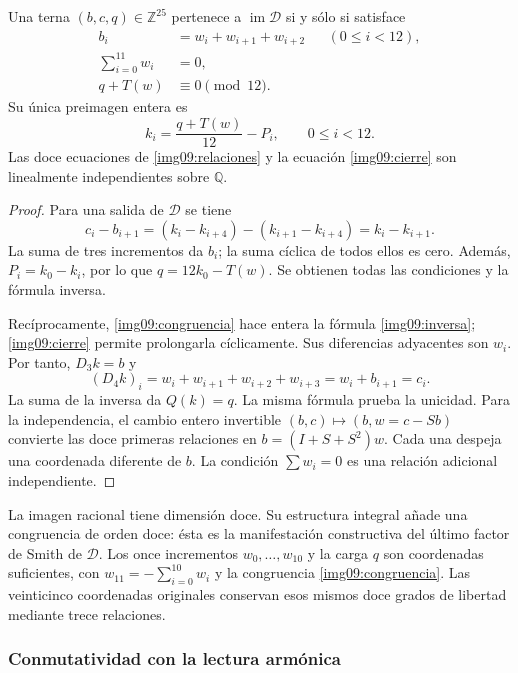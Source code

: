 \begin{theorem}
\label{img09:imagen}
Una terna $(b,c,q)\in\mathbb Z^{25}$ pertenece a
$\operatorname{im}\mathcal D$ si y sólo si satisface
\begin{align}
 b_i&=w_i+w_{i+1}+w_{i+2}&& (0\leq i<12),
 \label{img09:relaciones}\\
 \sum_{i=0}^{11}w_i&=0,
 \label{img09:cierre}\\
 q+T(w)&\equiv0\pmod {12}.
 \label{img09:congruencia}
\end{align}
Su única preimagen entera es
\begin{equation}
 k_i=\frac{q+T(w)}{12}-P_i,\qquad0\leq i<12.
 \label{img09:inversa}
\end{equation}
Las doce ecuaciones de \eqref{img09:relaciones} y la ecuación
\eqref{img09:cierre} son linealmente independientes sobre $\mathbb Q$.
\end{theorem}
\begin{proof}
Para una salida de $\mathcal D$ se tiene
\[
 c_i-b_{i+1}=(k_i-k_{i+4})-(k_{i+1}-k_{i+4})=k_i-k_{i+1}.
\]
La suma de tres incrementos da $b_i$; la suma cíclica de todos ellos
es cero. Además, $P_i=k_0-k_i$, por lo que
$q=12k_0-T(w)$. Se obtienen todas las condiciones y la fórmula inversa.

Recíprocamente, \eqref{img09:congruencia} hace entera la fórmula
\eqref{img09:inversa}; \eqref{img09:cierre} permite prolongarla
cíclicamente. Sus diferencias adyacentes son $w_i$. Por tanto,
$D_3k=b$ y
\[
 (D_4k)_i=w_i+w_{i+1}+w_{i+2}+w_{i+3}
 =w_i+b_{i+1}=c_i.
\]
La suma de la inversa da $Q(k)=q$. La misma fórmula prueba la unicidad.
Para la independencia, el cambio entero invertible
$(b,c)\mapsto(b,w=c-Sb)$ convierte las doce primeras relaciones en
$b=(I+S+S^2)w$. Cada una despeja una coordenada diferente de $b$.
La condición $\sum w_i=0$ es una relación adicional independiente.
\end{proof}

La imagen racional tiene dimensión doce. Su estructura integral añade
una congruencia de orden doce: ésta es la manifestación constructiva del
último factor de Smith de $\mathcal D$. Los once incrementos
$w_0,\ldots,w_{10}$ y la carga $q$ son coordenadas suficientes, con
$w_{11}=-\sum_{i=0}^{10}w_i$ y la congruencia
\eqref{img09:congruencia}. Las veinticinco coordenadas originales
conservan esos mismos doce grados de libertad mediante trece relaciones.

\subsubsection{Conmutatividad con la lectura armónica}

